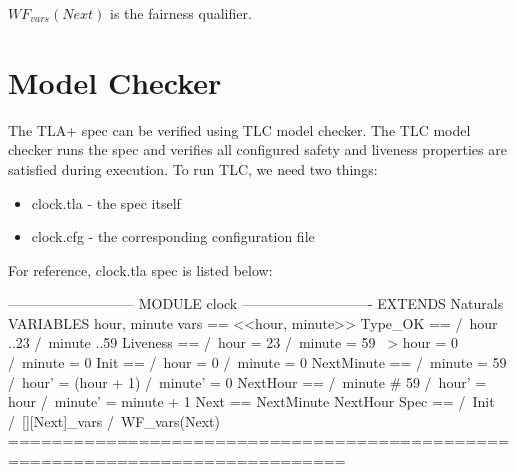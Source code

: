\documentclass{report}
\begin{document}
$WF_{vars}(Next)$ is the fairness qualifier.


\section{Model Checker}

The TLA+ spec can be verified using TLC model checker. The TLC model checker
runs the spec and verifies all configured safety and liveness properties are
satisfied during execution. To run TLC, we need two things:
\begin{itemize}
    \item clock.tla - the spec itself
    \item clock.cfg - the corresponding configuration file
\end{itemize}

For reference, clock.tla spec is listed below:

\begin{tla}
--------------------------- MODULE clock ----------------------------
EXTENDS Naturals
VARIABLES hour, minute
vars == <<hour, minute>>
Type_OK == 
    /\ hour ..23
    /\ minute ..59
Liveness ==
    /\ hour = 23 /\ minute = 59 ~> hour = 0 /\ minute = 0
Init ==
    /\ hour = 0
    /\ minute = 0
NextMinute ==
    /\ minute = 59 
    /\ hour' = (hour + 1) %
    /\ minute' = 0
NextHour == 
    /\ minute # 59
    /\ hour' = hour 
    /\ minute' = minute + 1 
Next ==
    \/ NextMinute
    \/ NextHour
Spec ==
  /\ Init
  /\ [][Next]_vars
  /\ WF_vars(Next)
=============================================================================
\end{tla}
\begin{tlatex}
\@x{}\moduleLeftDash{}\moduleRightDash\@xx{}%
%
%
%
%
%
%
%
%
%
%
%
%
%
%
%
%
%
%
%
%
%
%
%
%
%
\@x{}\bottombar\@xx{}%
\end{tlatex}
\end{document}
